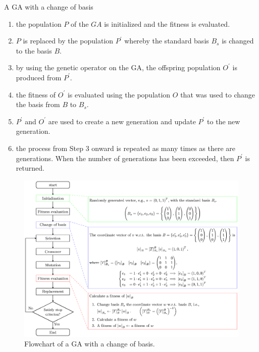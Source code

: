 \begin{algorithm}[H]
	\centering
	\caption{A GA with a change of basis} \label{alg:step}
	\begin{algorithmic}
		\State
		\begin{enumerate}[leftmargin=*, label=Step \arabic*:]
			\item the population $ P $ of the $ GA $ is initialized and the fitness is evaluated.
			\item $ P $ is replaced by the population $ P^\prime $ whereby the standard basis $ B_s $ is changed to the basis $ B $.
			\item by using the genetic operator on the GA, the offspring population $ O^\prime $ is produced from $ P^\prime $.
			\item the fitness of $ O^\prime $ is evaluated using the population $ O $ that was used to change the basis from $ B $ to $ B_s $.
			\item $ P^\prime $ and $ O^\prime $ are used to create a new generation and update $ P^\prime $ to the new generation.
			\item the process from Step 3 onward is repeated as many times as there are generations. When the number of generations has been exceeded, then $ P^\prime $ is returned.
		\end{enumerate}
	\end{algorithmic}
\end{algorithm}

\begin{figure}[ht!]
	\centering
	\includegraphics[width=\textwidth]{./flowchart_change_basis}
	\caption{Flowchart of a GA with a change of basis.} \label{fig:flowchart}
\end{figure}

